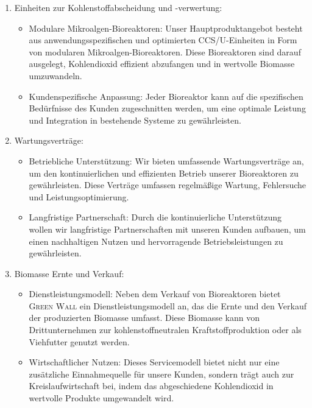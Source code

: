 \begin{enumerate}
    \item Einheiten zur Kohlenstoffabscheidung und -verwertung:
          \begin{itemize}
              \item Modulare Mikroalgen-Bioreaktoren: Unser Hauptproduktangebot besteht aus anwendungsspezifischen und optimierten CCS/U-Einheiten in Form von modularen Mikroalgen-Bioreaktoren.
                    Diese Bioreaktoren sind darauf ausgelegt, Kohlendioxid effizient abzufangen und in wertvolle Biomasse umzuwandeln.
              \item Kundenspezifische Anpassung: Jeder Bioreaktor kann auf die spezifischen Bedürfnisse des Kunden zugeschnitten werden, um eine optimale Leistung und Integration in bestehende Systeme zu gewährleisten.
          \end{itemize}
    \item Wartungsverträge:
          \begin{itemize}
              \item Betriebliche Unterstützung: Wir bieten umfassende Wartungsverträge an, um den kontinuierlichen und effizienten Betrieb unserer Bioreaktoren zu gewährleisten.
                    Diese Verträge umfassen regelmäßige Wartung, Fehlersuche und Leistungsoptimierung.
              \item Langfristige Partnerschaft: Durch die kontinuierliche Unterstützung wollen wir langfristige Partnerschaften mit unseren Kunden aufbauen, um einen nachhaltigen Nutzen und hervorragende Betriebsleistungen zu gewährleisten.
          \end{itemize}
    \item Biomasse Ernte und Verkauf:
          \begin{itemize}
              \item Dienstleistungsmodell: Neben dem Verkauf von Bioreaktoren bietet \textsc{Green Wall} ein Dienstleistungsmodell an, das die Ernte und den Verkauf der produzierten Biomasse umfasst.
                    Diese Biomasse kann von Drittunternehmen zur kohlenstoffneutralen Kraftstoffproduktion oder als Viehfutter genutzt werden.
              \item Wirtschaftlicher Nutzen: Dieses Servicemodell bietet nicht nur eine zusätzliche Einnahmequelle für unsere Kunden, sondern trägt auch zur Kreislaufwirtschaft bei, indem das abgeschiedene Kohlendioxid in wertvolle Produkte umgewandelt wird.
          \end{itemize}
\end{enumerate}


